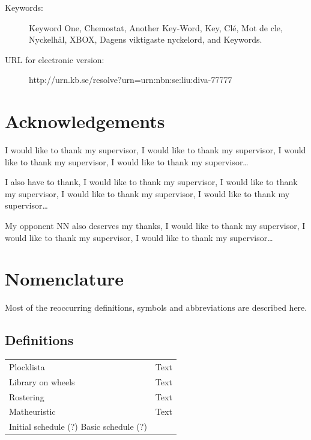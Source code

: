 \documentclass[a4paper, 10pt, twoside, openright]{book}
\newcommand{\putkeywords}[0]{%
Keyword One, Chemostat, Another Key-Word, Key, Clé, Mot de cle,
Nyckelhål, XBOX, Dagens viktigaste nyckelord, and Keywords.}
\begin{document}
\begin{description}
\item[Keywords:]{%
\putkeywords
}
\item[URL for electronic version: ]{\hfill%
\begin{center}
http://urn.kb.se/resolve?urn=urn:nbn:se:liu:diva-77777
\end{center}
}
\end{description}



\chapter*{Acknowledgements}

I would like to thank my supervisor, I would like to thank my
supervisor, I would like to thank my supervisor, I would like to thank my supervisor\ldots

I also have to thank, I would like to thank my supervisor, I would
like to thank my supervisor, I would like to thank my supervisor, I
would like to thank my supervisor\ldots

My opponent NN also deserves my thanks, I would like to thank my
supervisor, I would like to thank my supervisor, I would like to thank my supervisor\ldots





\chapter*{Nomenclature}

Most of the reoccurring definitions, symbols and abbreviations are described here.

\section*{Definitions}
\begin{tabular}{ll}
Plocklista & Text\\
Library on wheels & Text\\
Rostering & Text\\
Matheuristic & Text\\
Initial schedule (?)
Basic schedule (?)
\end{tabular}
\end{document}
